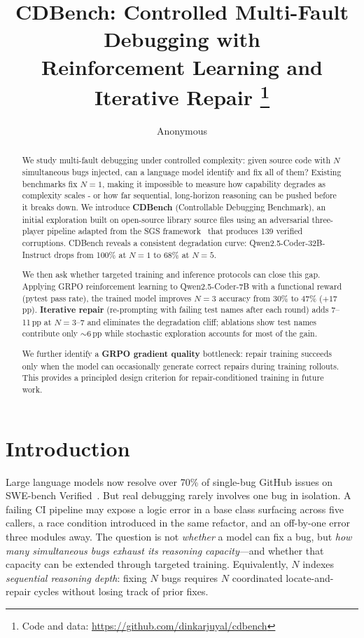 \documentclass[12pt]{article}
\title{CDBench: Controlled Multi-Fault Debugging with\\Reinforcement Learning and Iterative Repair%
\thanks{Code and data: \url{https://github.com/dinkarjuyal/cdbench}}}
\author{Anonymous}
\begin{document}
\maketitle

\begin{abstract}
We study multi-fault debugging under controlled complexity: given source code
with $N$ simultaneous bugs injected, can a language model identify and fix all
of them? Existing benchmarks fix $N{=}1$, making it impossible to measure how
capability degrades as complexity scales - or how far sequential, long-horizon
reasoning can be pushed before it breaks down. We introduce \textbf{CDBench} (Controllable Debugging Benchmark), an initial exploration built
on open-source library source files using an adversarial three-player pipeline
adapted from the SGS framework~\cite{sgs2025} that produces 139 verified
corruptions. CDBench reveals a consistent degradation curve:
Qwen2.5-Coder-32B-Instruct drops from 100\% at $N{=}1$ to 68\% at $N{=}5$.

We then ask whether targeted training and inference protocols can close this
gap. Applying GRPO reinforcement learning to Qwen2.5-Coder-7B with a
functional reward (pytest pass rate), the trained model improves $N{=}3$
accuracy from 30\% to 47\% ($+17$\,pp).
\textbf{Iterative repair} (re-prompting with failing test names after each
round) adds 7--11\,pp at $N{=}3$--7 and eliminates the degradation cliff;
ablations show test names contribute only ${\sim}6$\,pp while stochastic
exploration accounts for most of the gain.

We further identify a \textbf{GRPO gradient quality} bottleneck: repair
training succeeds only when the model can occasionally generate correct repairs
during training rollouts. This provides a principled design criterion for
repair-conditioned training in future work.
\end{abstract}

\section{Introduction}
\label{sec:intro}

Large language models now resolve over 70\% of single-bug GitHub issues on
SWE-bench Verified~\cite{jimenez2024swebench}. But real debugging rarely
involves one bug in isolation. A failing CI pipeline may expose a logic error
in a base class surfacing across five callers, a race condition introduced in
the same refactor, and an off-by-one error three modules away. The question is
not \emph{whether} a model can fix a bug, but \emph{how many simultaneous bugs
exhaust its reasoning capacity}---and whether that capacity can be extended
through targeted training. Equivalently, $N$ indexes \emph{sequential reasoning
depth}: fixing $N$ bugs requires $N$ coordinated locate-and-repair cycles without
losing track of prior fixes.
\end{document}
